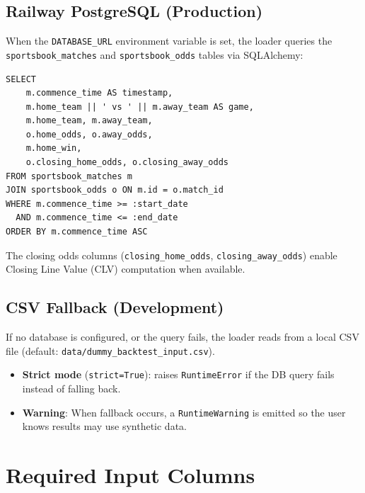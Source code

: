\documentclass[12pt,a4paper]{report}
\theoremstyle{definition}
\newcommand{\code}[1]{\texttt{#1}}
\newcommand{\file}[1]{\texttt{#1}}
\begin{document}
\subsection{Railway PostgreSQL (Production)}

When the \code{DATABASE\_URL} environment variable is set, the loader queries the \code{sportsbook\_matches} and \code{sportsbook\_odds} tables via SQLAlchemy:

\begin{lstlisting}[caption={Database query for historical games.}]
SELECT
    m.commence_time AS timestamp,
    m.home_team || ' vs ' || m.away_team AS game,
    m.home_team, m.away_team,
    o.home_odds, o.away_odds,
    m.home_win,
    o.closing_home_odds, o.closing_away_odds
FROM sportsbook_matches m
JOIN sportsbook_odds o ON m.id = o.match_id
WHERE m.commence_time >= :start_date
  AND m.commence_time <= :end_date
ORDER BY m.commence_time ASC
\end{lstlisting}

The closing odds columns (\code{closing\_home\_odds}, \code{closing\_away\_odds}) enable Closing Line Value (CLV) computation when available.

\subsection{CSV Fallback (Development)}

If no database is configured, or the query fails, the loader reads from a local CSV file (default: \file{data/dummy\_backtest\_input.csv}).

\begin{itemize}
    \item \textbf{Strict mode} (\code{strict=True}): raises \code{RuntimeError} if the DB query fails instead of falling back.
    \item \textbf{Warning}: When fallback occurs, a \code{RuntimeWarning} is emitted so the user knows results may use synthetic data.
\end{itemize}

\section{Required Input Columns}
\end{document}
